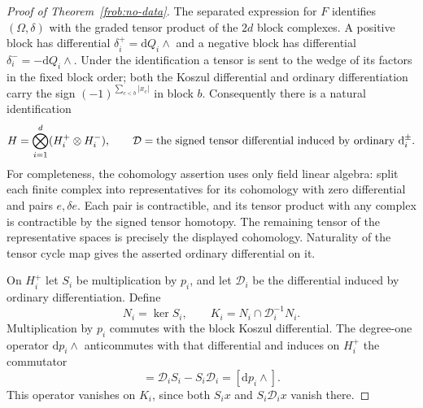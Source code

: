 \begin{proof}[Proof of Theorem~\ref{frob:no-data}]
The separated expression for $F$ identifies $(\Omega,\delta)$ with
the graded tensor product of the $2d$ block complexes.  A positive
block has differential $\delta_i^+=\mathrm dQ_i\wedge{}$ and a negative
block has differential $\delta_i^-=-\mathrm dQ_i\wedge{}$.  Under the
identification a tensor is sent to the wedge of its factors in the
fixed block order; both the Koszul differential and ordinary
differentiation carry the sign $(-1)^{\sum_{c<b}|x_c|}$ in block $b$.
Consequently there is a natural identification
\begin{equation}
 H=\bigotimes_{i=1}^d(H_i^+\otimes H_i^-),\qquad
 \mathcal D=\hbox{the signed tensor differential induced by ordinary }
                 \mathrm d_i^\pm.
 \label{frob:kunnet}
\end{equation}
For completeness, the cohomology assertion uses only field linear
algebra: split each finite complex into representatives for its
cohomology with zero differential and pairs $e,\delta e$.  Each pair
is contractible, and its tensor product with any complex is
contractible by the signed tensor homotopy.  The remaining tensor of
the representative spaces is precisely the displayed cohomology.
Naturality of the tensor cycle map gives the asserted ordinary
differential on it.

On $H_i^+$ let $S_i$ be multiplication by $p_i$, and let $\mathcal D_i$
be the differential induced by ordinary differentiation.  Define
\begin{equation}
 N_i=\ker S_i,\qquad K_i=N_i\cap\mathcal D_i^{-1}N_i.
 \label{frob:ki}
\end{equation}
Multiplication by $p_i$ commutes with the block Koszul differential.
The degree-one operator $\mathrm dp_i\wedge{}$ anticommutes with that
differential and induces on $H_i^+$ the commutator
\begin{equation}
 [\mathcal D_i,S_i]=\mathcal D_iS_i-S_i\mathcal D_i
                           =[\mathrm dp_i\wedge{}].
 \label{frob:commutator}
\end{equation}
This operator vanishes on $K_i$, since both $S_i x$ and
$S_i\mathcal D_i x$ vanish there.


\end{proof}
